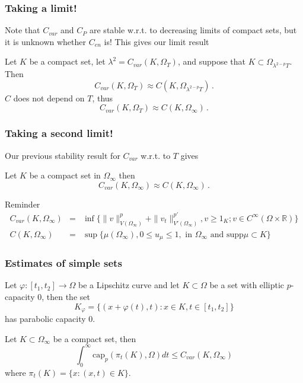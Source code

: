 \documentclass[10pt]{beamer}
\newcommand{\R}{\mathbb{R}}
\renewcommand{\phi}{\varphi}
\providecommand{\supp}{\textrm{supp}}
\begin{document}
\begin{frame}
	\frametitle{Taking a limit!}
	Note that $C_{var}$ and $C_{P}$ are stable w.r.t. to decreasing limits of compact sets, but it is unknown whether $C_{en}$ is! This gives our limit result
	\begin{theorem}
		Let $K$ be a compact set, let $\lambda^2 = C_{var}(K,\Omega_T)$, and suppose that $K \subset \Omega_{\lambda^{2-p}T}$. Then
		\begin{equation} \nonumber \label{}
			C_{var}(K,\Omega_T) \approx C(K,\Omega_{\lambda^{2-p}T})\,.
		\end{equation}
		$C$ does not depend on $T$, thus
		\begin{equation} \nonumber \label{}
			C_{var}(K,\Omega_T) \approx C(K,\Omega_{\infty})\,.
		\end{equation}
	\end{theorem}
\end{frame}
\begin{frame}
	\frametitle{Taking a second limit!}
	Our previous stability result for $C_{var}$ w.r.t. to $T$ gives
	\begin{theorem}
		Let $K$ be a compact set in $\Omega_\infty$ then
		\begin{equation} \nonumber \label{}
			C_{var}(K,\Omega_\infty) \approx C(K,\Omega_{\infty})\,.
		\end{equation}
	\end{theorem}
	\pause
	\begin{block}{Reminder}
		\begin{eqnarray} \nonumber \label{}
			C_{var}(K,\Omega_\infty) &=& \inf \{\|v\|^{p}_{V(\Omega_{\infty})} + \|v_t\|^{p'}_{V'(\Omega_{\infty})}, v \geq 1_K; v \in C^\infty(\Omega \times \R) \} \\
			C(K,\Omega_\infty) &=& \sup\{\mu(\Omega_\infty), 0 \leq u_\mu \leq 1, \text{ in $\Omega_\infty$ and $\supp \mu \subset K$}\}
		\end{eqnarray}
	\end{block}
\end{frame}
\begin{frame}
	\frametitle{Estimates of simple sets}
	\begin{theorem}
		Let $\phi:[t_1,t_2] \to \Omega$ be a Lipschitz curve and let $K \subset \Omega$ be a set with elliptic $p$-capacity $0$, then the set
		\begin{equation} \nonumber \label{}
			K_{\phi} = \{(x+\phi(t),t): x \in K, t \in [t_1,t_2]\}
		\end{equation}
		has parabolic capacity $0$.
	\end{theorem}
	\pause
	\begin{theorem}
		Let $K \subset \Omega_\infty$ be a compact set, then
		\begin{equation} \nonumber \label{}
			\int_0^\infty \text{cap}_p(\pi_t(K),\Omega) dt \leq C_{var}(K,\Omega_\infty)
		\end{equation}
		where $\pi_t(K) = \{x: (x,t) \in K\}$.
	\end{theorem}
\end{frame}
\end{document}
